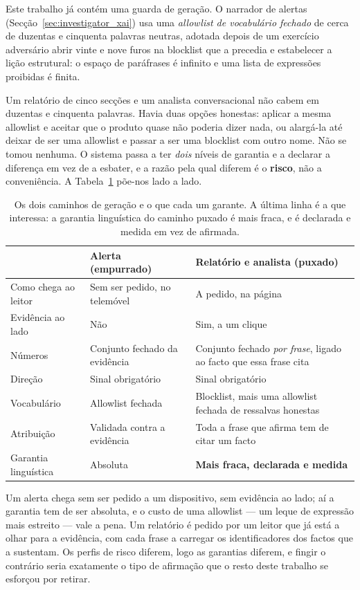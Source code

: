 Este trabalho já contém uma guarda de geração. O narrador de alertas
(Secção~\ref{sec:investigator_xai}) usa uma \emph{allowlist de vocabulário fechado} de cerca de
duzentas e cinquenta palavras neutras, adotada depois de um exercício adversário abrir vinte e nove
furos na blocklist que a precedia e estabelecer a lição estrutural: o espaço de paráfrases é infinito
e uma lista de expressões proibidas é finita.

Um relatório de cinco secções e um analista conversacional não cabem em duzentas e cinquenta
palavras. Havia duas opções honestas: aplicar a mesma allowlist e aceitar que o produto quase não
poderia dizer nada, ou alargá-la até deixar de ser uma allowlist e passar a ser uma blocklist com
outro nome. Não se tomou nenhuma. O sistema passa a ter \emph{dois} níveis de garantia e a declarar a
diferença em vez de a esbater, e a razão pela qual diferem é o \textbf{risco}, não a conveniência.
A Tabela~\ref{tab:two_guards} põe-nos lado a lado.

\begin{table}[ht]
\centering
\caption[Dois níveis de garantia de geração]{Os dois caminhos de geração e o que cada um garante. A
última linha é a que interessa: a garantia linguística do caminho puxado é mais fraca, e é declarada
e medida em vez de afirmada.}
\label{tab:two_guards}
\begin{tabular}{p{}p{}p{}}
\toprule
& Alerta (empurrado) & Relatório e analista (puxado) \\
\midrule
Como chega ao leitor & Sem ser pedido, no telemóvel & A pedido, na página \\
Evidência ao lado & Não & Sim, a um clique \\
Números & Conjunto fechado da evidência & Conjunto fechado \emph{por frase}, ligado ao facto que
essa frase cita \\
Direção & Sinal obrigatório & Sinal obrigatório \\
Vocabulário & Allowlist fechada & Blocklist, mais uma allowlist fechada de ressalvas honestas \\
Atribuição & Validada contra a evidência & Toda a frase que afirma tem de citar um facto \\
Garantia linguística & Absoluta & \textbf{Mais fraca, declarada e medida} \\
\bottomrule
\end{tabular}
\end{table}

Um alerta chega sem ser pedido a um dispositivo, sem evidência ao lado; aí a garantia tem de ser
absoluta, e o custo de uma allowlist --- um leque de expressão mais estreito --- vale a pena. Um
relatório é pedido por um leitor que já está a olhar para a evidência, com cada frase a carregar os
identificadores dos factos que a sustentam. Os perfis de risco diferem, logo as garantias diferem, e
fingir o contrário seria exatamente o tipo de afirmação que o resto deste trabalho se esforçou por
retirar.

